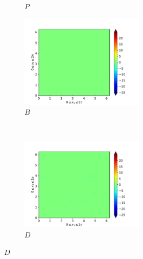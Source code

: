 \begin{figure}[H]
\begin{subfigure}{0.45\textwidth}
        \caption{$P$}
    \end{subfigure}
    \newline
    \begin{subfigure}{0.45\textwidth}
        \includegraphics[height=1.75in]{media/run-cds-65/B-ke-1420}
        \caption{$B$}
    \end{subfigure}
    ~
    \begin{subfigure}{0.45\textwidth}
        \includegraphics[height=1.75in]{media/run-cds-65/D-ke-1420}
        \caption{$D$}
    \end{subfigure}
\end{figure}

\newpage
